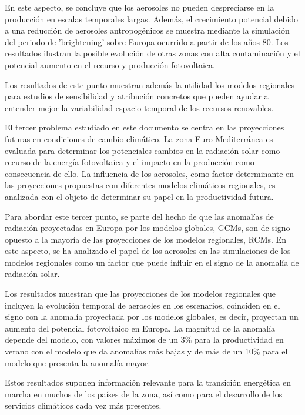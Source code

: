 En este aspecto, se concluye que los aerosoles no pueden despreciarse en la producción en escalas temporales largas. Además, el crecimiento potencial debido a una reducción de aerosoles antropogénicos se muestra mediante la simulación del periodo de 'brightening' sobre Europa ocurrido a partir de los años 80. Los resultados ilustran la posible evolución de otras zonas con alta contaminación y el potencial aumento en el recurso y producción fotovoltaica.

Los resultados de este punto muestran además la utilidad los modelos regionales para estudios de sensibilidad y atribución concretos que pueden ayudar a entender mejor la variabilidad espacio-temporal de los recursos renovables.\\

\starbreak

El tercer problema estudiado en este documento se centra en las proyecciones futuras en condiciones de cambio climático. La zona Euro-Mediterránea es evaluada para determinar los potenciales cambios en la radiación solar como recurso de la energía fotovoltaica y el impacto en la producción como consecuencia de ello. La influencia de los aerosoles, como factor determinante en las proyecciones propuestas con diferentes modelos climáticos regionales, es analizada con el objeto de determinar su papel en la productividad futura.

Para abordar este tercer punto, se parte del hecho de que las anomalías de radiación proyectadas en Europa por los modelos globales, GCMs, son de signo opuesto a la mayoría de las proyecciones de los modelos regionales, RCMs. En este aspecto, se ha analizado el papel de los aerosoles en las simulaciones de los modelos regionales como un factor que puede influir en el signo de la anomalía de radiación solar.

Los resultados muestran que las proyecciones de los modelos regionales que incluyen la evolución temporal de aerosoles en los escenarios, coinciden en el signo con la anomalía proyectada por los modelos globales, es decir, proyectan un aumento del potencial fotovoltaico en Europa. La magnitud de la anomalía depende del modelo, con valores máximos de un 3$\%$ para la productividad en verano con el modelo que da anomalías más bajas y de más de un 10$\%$ para el modelo que presenta la anomalía mayor. 

Estos resultados suponen información relevante para la transición energética en marcha en muchos de los países de la zona, así como para el desarrollo de los servicios climáticos cada vez más presentes.

